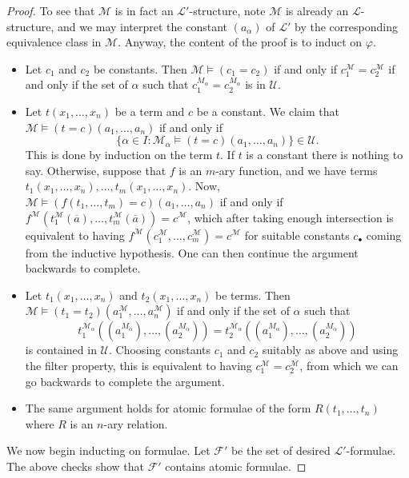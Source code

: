 \documentclass[../notes.tex]{subfiles}
\begin{document}
\begin{proof}
	To see that $\mathcal M$ is in fact an $\mathcal L'$-structure, note $\mathcal M$ is already an $\mathcal L$-structure, and we may interpret the constant $(a_\alpha)$ of $\mathcal L'$ by the corresponding equivalence class in $\mathcal M$. Anyway, the content of the proof is to induct on $\varphi$.
	\begin{itemize}
		\item Let $c_1$ and $c_2$ be constants. Then $\mathcal M\models(c_1=c_2)$ if and only if $c_1^\mathcal M=c_2^\mathcal M$ if and only if the set of $\alpha$ such that $c_1^{M_\alpha}=c_2^{M_\alpha}$ is in $\mathcal U$.
		\item Let $t(x_1,\ldots,x_n)$ be a term and $c$ be a constant. We claim that $\mathcal M\models(t=c)(a_1,\ldots,a_n)$ if and only if
		\[\{\alpha\in I:\mathcal M_\alpha\models(t=c)(a_1,\ldots,a_n)\}\in\mathcal U.\]
		This is done by induction on the term $t$. If $t$ is a constant there is nothing to say. Otherwise, suppose that $f$ is an $m$-ary function, and we have terms $t_1(x_1,\ldots,x_n),\ldots,t_m(x_1,\ldots,x_n)$. Now, $\mathcal M\models(f(t_1,\ldots,t_m)=c)(a_1,\ldots,a_n)$ if and only if $f^\mathcal M\left(t_1^\mathcal M(\overline a),\ldots,t_m^\mathcal M(\overline a)\right)=c^\mathcal M$, which after taking enough intersection is equivalent to having $f^\mathcal M\left(c_1^\mathcal M,\ldots,c_m^\mathcal M\right)=c^\mathcal M$ for suitable constants $c_\bullet$ coming from the inductive hypothesis. One can then continue the argument backwards to complete.
		\item Let $t_1(x_1,\ldots,x_n)$ and $t_2(x_1,\ldots,x_n)$ be terms. Then $\mathcal M\models(t_1=t_2)\left(a_1^\mathcal M,\ldots,a_n^\mathcal M\right)$ if and only if the set of $\alpha$ such that
		\[t_1^{\mathcal M_\alpha}\left((a_1^{M_\alpha}),\ldots,(a_2^{M_\alpha})\right)=t_2^{\mathcal M_\alpha}\left((a_1^{M_\alpha}),\ldots,(a_2^{M_\alpha})\right)\]
		is contained in $\mathcal U$. Choosing constants $c_1$ and $c_2$ suitably as above and using the filter property, this is equivalent to having $c_1^\mathcal M=c_2^\mathcal M$, from which we can go backwards to complete the argument.
		\item The same argument holds for atomic formulae of the form $R(t_1,\ldots,t_n)$ where $R$ is an $n$-ary relation.
	\end{itemize}
	We now begin inducting on formulae. Let $\mathcal F'$ be the set of desired $\mathcal L'$-formulae. The above checks show that $\mathcal F'$ contains atomic formulae.

\end{proof}
\end{document}
